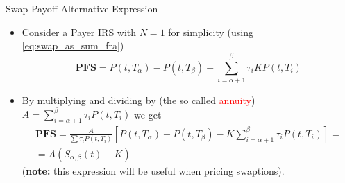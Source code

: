 \documentclass{beamer}
\begin{document}
\begin{frame}{Swap Payoff Alternative Expression}
	\begin{itemize}
		\item<1-> Consider a Payer IRS with $N=1$ for simplicity (using \cref{eq:swap_as_sum_fra})
		\begin{equation*}
			\textbf{PFS} = P(t,T_\alpha)-P(t,T_\beta)-\sum_{i=\alpha+1}^{\beta}\tau_iKP(t,T_i)
		\end{equation*}
		\item<2-> By multiplying and dividing by (the so called \textcolor{red}{annuity}) $A = \sum_{i=\alpha+1}^{\beta}\tau_iP(t, T_i)$
		we get
		\begin{equation}
			\begin{gathered}
			\textbf{PFS}=\frac{A}{\sum\tau_iP(t, T_i)}\left[P(t,T_\alpha)-P(t,T_\beta)-K\sum_{i=\alpha+1}^{\beta}\tau_i P(t,T_i)\right]=\\
			= \boxed{A (S_{\alpha,\beta}(t)-K)}
			\end{gathered}
		\label{eq:swap_payoff_with_swap_rate}
		\end{equation}
		(\textbf{note:} this expression will be useful when pricing swaptions).
	\end{itemize}
\end{frame}
\end{document}
